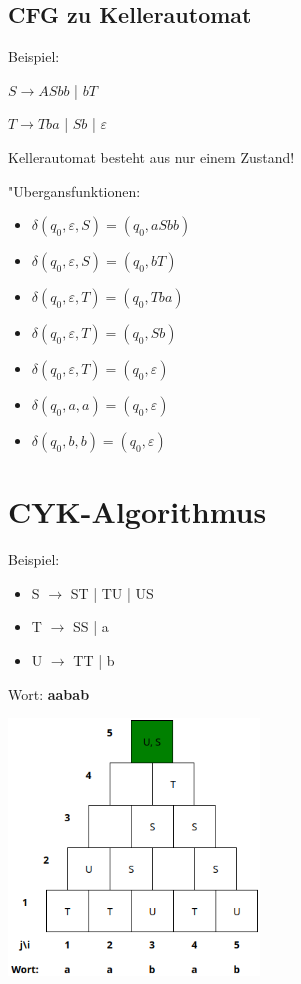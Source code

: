 \documentclass[11pt, a4paper]{scrartcl}
\begin{document}
\subsection{CFG zu Kellerautomat}

Beispiel:

\vspace{0.5em}

$S \rightarrow ASbb$ | $bT$

$T \rightarrow Tba$ | $Sb$ | $\varepsilon$

\vspace{0.5em}

Kellerautomat besteht aus nur einem Zustand!

\vspace{0.5em}

"Ubergansfunktionen:
\begin{itemize}
    \item $\delta(q_0, \varepsilon, S) = (q_0, aSbb)$
    \item $\delta(q_0, \varepsilon, S) = (q_0, bT)$
    \item $\delta(q_0, \varepsilon, T) = (q_0, Tba)$
    \item $\delta(q_0, \varepsilon, T) = (q_0, Sb)$
    \item $\delta(q_0, \varepsilon, T) = (q_0, \varepsilon)$
    \item $\delta(q_0, a, a) = (q_0, \varepsilon)$
    \item $\delta(q_0, b, b) = (q_0, \varepsilon)$
\end{itemize}



\newpage


\section{CYK-Algorithmus}

Beispiel:

\begin{itemize}
    \item S $\rightarrow$ ST | TU | US
    \item T $\rightarrow$ SS | a
    \item U $\rightarrow$ TT | b
\end{itemize}

Wort: \textbf{aabab}

\vspace{2em}

\includegraphics[width=0.5\textwidth]{CYK-00.png}
\end{document}

